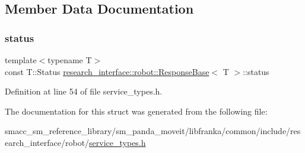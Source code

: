 \subsection{Member Data Documentation}
\mbox{\label{structresearch__interface_1_1robot_1_1ResponseBase_a99bb821172a0ac77338cd8e0acbe8a96}} 
\subsubsection{\texorpdfstring{status}{status}}
{\footnotesize\ttfamily template$<$typename T$>$ \\
const T\+::\+Status \hyperlink{structresearch__interface_1_1robot_1_1ResponseBase}{research\+\_\+interface\+::robot\+::\+Response\+Base}$<$ T $>$\+::status}



Definition at line 54 of file service\+\_\+types.\+h.



The documentation for this struct was generated from the following file\+:\begin{DoxyCompactItemize}
\item 
smacc\+\_\+sm\+\_\+reference\+\_\+library/sm\+\_\+panda\+\_\+moveit/libfranka/common/include/research\+\_\+interface/robot/\hyperlink{service__types_8h}{service\+\_\+types.\+h}\end{DoxyCompactItemize}
